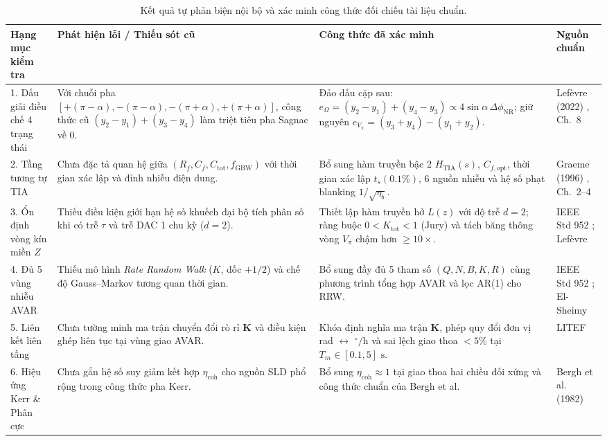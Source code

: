 \documentclass[11pt, a4paper]{article}
\begin{document}
\begin{table}[htbp]
\centering
\caption{Kết quả tự phản biện nội bộ và xác minh công thức đối chiếu tài liệu chuẩn.}
\label{tab:audit}
\footnotesize
\renewcommand{\arraystretch}{1.22}
\begin{tabular}{@{}L{2.8cm} L{4.3cm} L{5.3cm} L{3.3cm}@{}}
\toprule
\textbf{Hạng mục kiểm tra} & \textbf{Phát hiện lỗi / Thiếu sót cũ} & \textbf{Công thức đã xác minh} & \textbf{Nguồn chuẩn} \\
. Dấu giải điều chế 4 trạng thái & Với chuỗi pha $[+(\pi-\alpha), -(\pi-\alpha), -(\pi+\alpha), +(\pi+\alpha)]$, công thức cũ $(y_2-y_1)+(y_3-y_4)$ làm triệt tiêu pha Sagnac về $0$. & Đảo dấu cặp sau: $e_\Omega = (y_2-y_1)+(y_4-y_3) \propto 4\sin\alpha\,\Delta\phi_{\text{NR}}$; giữ nguyên $e_{V_\pi} = (y_3+y_4)-(y_1+y_2)$. & Lefèvre (2022) \cite{lefevre2022}, Ch.~8 \\
2. Tầng tương tự TIA & Chưa đặc tả quan hệ giữa $(R_f, C_f, C_{\text{tot}}, f_{\text{GBW}})$ với thời gian xác lập và đỉnh nhiễu điện dung. & Bổ sung hàm truyền bậc 2 $H_{\text{TIA}}(s)$, $C_{f,\text{opt}}$, thời gian xác lập $t_s(0.1\%)$, 6 nguồn nhiễu và hệ số phạt blanking $1/\sqrt{\eta_b}$. & Graeme (1996) \cite{graeme1996}, Ch.~2--4 \\
3. Ổn định vòng kín miền $Z$ & Thiếu điều kiện giới hạn hệ số khuếch đại bộ tích phân số khi có trễ $\tau$ và trễ DAC 1 chu kỳ ($d=2$). & Thiết lập hàm truyền hở $L(z)$ với độ trễ $d=2$; ràng buộc $0 < K_{\text{tot}} < 1$ (Jury) và tách băng thông vòng $V_\pi$ chậm hơn $\ge 10\times$. & IEEE Std 952 \cite{ieee952}; Lefèvre \cite{lefevre2022} \\
4. Đủ 5 vùng nhiễu AVAR & Thiếu mô hình \emph{Rate Random Walk} ($K$, dốc $+1/2$) và chế độ Gauss--Markov tương quan thời gian. & Bổ sung đầy đủ 5 tham số $(Q, N, B, K, R)$ cùng phương trình tổng hợp AVAR và lọc AR(1) cho RRW. & IEEE Std 952 \cite{ieee952}; El-Sheimy \cite{elsheimy2008} \\
5. Liên kết liên tầng & Chưa tường minh ma trận chuyển đổi rò rỉ $\mathbf{K}$ và điều kiện ghép liên tục tại vùng giao AVAR. & Khóa định nghĩa ma trận $\mathbf{K}$, phép quy đổi đơn vị rad $\leftrightarrow$ $^\circ/\text{h}$ và sai lệch giao thoa $<5\%$ tại $T_m \in [0.1, 5]\text{ s}$. & LITEF \cite{waydhas2011, rieke2011} \\
6. Hiệu ứng Kerr \& Phân cực & Chưa gắn hệ số suy giảm kết hợp $\eta_{\text{coh}}$ cho nguồn SLD phổ rộng trong công thức pha Kerr. & Bổ sung $\eta_{\text{coh}} \approx 1$ tại giao thoa hai chiều đối xứng và công thức chuẩn của Bergh et al. & Bergh et al. (1982) \cite{bergh1982} \\
\bottomrule
\end{tabular}
\end{table}
\end{document}
